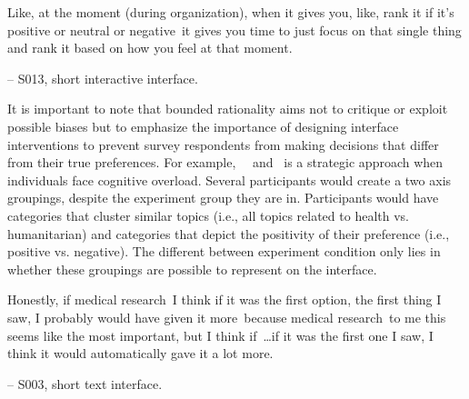 \begin{displayquote}
Like, at the moment (during organization), when it gives you, like, rank it if it's positive or neutral or negative~\bracketellipsis it gives you time to just focus on that single thing and rank it based on how you feel at that moment.
    
    \noindent \hfill -- S013, short interactive interface.
\end{displayquote}

It is important to note that bounded rationality aims not to critique or exploit possible biases but to emphasize the importance of designing interface interventions to prevent survey respondents from making decisions that differ from their true preferences. For example,~\underline{}~\cite{simonSciencesArtificial1996} and~\underline{} is a strategic approach when individuals face cognitive overload. Several participants would create a two axis groupings, despite the experiment group they are in. Participants would have categories that cluster similar topics (i.e., all topics related to health vs. humanitarian) and categories that depict the positivity of their preference (i.e., positive vs. negative). The different between experiment condition only lies in whether these groupings are possible to represent on the interface.

\begin{displayquote}
    Honestly, if medical research~\bracketellipsis I think if it was the first option, the first thing I saw, I probably would have given it more~\bracketellipsis because medical research~\bracketellipsis to me this seems like the most important, but I think if~\ldots if it was the first one I saw, I think it would automatically gave it a lot more.
        
    \noindent \hfill -- S003, short text interface.
\end{displayquote}

    
